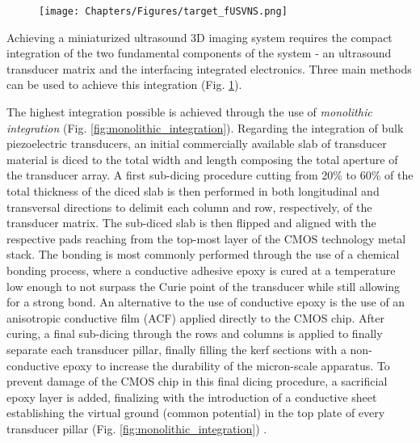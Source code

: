 \begin{figure}[ht]
  \centering
  \texttt{[image: Chapters/Figures/target\_fUSVNS.png]}
  \label{fig:asic_sensor_integration}
\end{figure}

Achieving a miniaturized ultrasound 3D imaging system requires the compact integration of the two fundamental components of the system - an ultrasound transducer matrix and the interfacing integrated electronics. Three main methods can be used to achieve this integration (Fig. \ref{fig:asic_sensor_integration}). 
\par
The highest integration possible is achieved through the use of \textit{monolithic integration} (Fig. \ref{fig:monolithic_integration}). Regarding the integration of bulk piezoelectric transducers, an initial commercially available slab of transducer material is diced to the total width and length composing the total aperture of the transducer array. A first sub-dicing procedure cutting from 20\% to 60\% of the total thickness of the diced slab is then performed in both longitudinal and transversal directions to delimit each column and row, respectively, of the transducer matrix. The sub-diced slab is then flipped and aligned with the respective pads reaching from the top-most layer of the CMOS technology metal stack. The bonding is most commonly performed through the use of a chemical bonding process, where a conductive adhesive epoxy is cured at a temperature low enough to not surpass the Curie point of the transducer while still allowing for a strong bond. An alternative to the use of conductive epoxy is the use of an anisotropic conductive film (ACF) applied directly to the CMOS chip. After curing, a final sub-dicing through the rows and columns is applied to finally separate each transducer pillar, finally filling the kerf sections with a non-conductive epoxy to increase the durability of the micron-scale apparatus. To prevent damage of the CMOS chip in this final dicing procedure, a sacrificial epoxy layer is added, finalizing with the introduction of a conductive sheet establishing the virtual ground (common potential) in the top plate of every transducer pillar (Fig. \ref{fig:monolithic_integration}) \cite{TiagoCosta2018}. 
